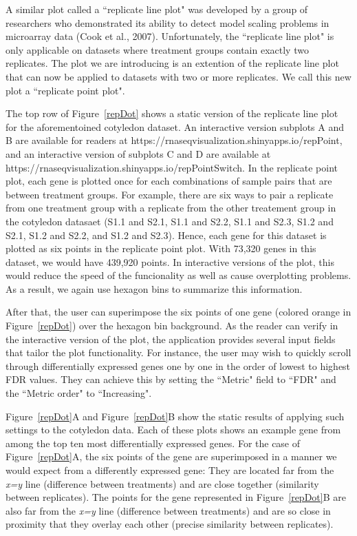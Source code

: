 \documentclass[useAMS,referee]{biom}
\begin{document}
A similar plot called a ``replicate line plot" was developed by a group of researchers who demonstrated its ability to detect model scaling problems in microarray data (Cook et al., 2007). Unfortunately, the ``replicate line plot" is only applicable on datasets where treatment groups contain exactly two replicates. The plot we are introducing is an extention of the replicate line plot that can now be applied to datasets with two or more replicates. We call this new plot a ``replicate point plot".

The top row of Figure~\ref{repDot} shows a static version of the replicate line plot for the aforementoined cotyledon dataset. An interactive version subplots A and B are available for readers at https://rnaseqvisualization.shinyapps.io/repPoint, and an interactive version of subplots C and D are available at https://rnaseqvisualization.shinyapps.io/repPointSwitch. In the replicate point plot, each gene is plotted once for each combinations of sample pairs that are between treatment groups. For example, there are six ways to pair a replicate from one treatment group with a replicate from the other treatement group in the cotyledon datasaet (S1.1 and S2.1, S1.1 and S2.2, S1.1 and S2.3, S1.2 and S2.1, S1.2 and S2.2, and S1.2 and S2.3). Hence, each gene for this dataset is plotted as six points in the replicate point plot. With 73,320 genes in this dataset, we would have 439,920 points. In interactive versions of the plot, this would reduce the speed of the funcionality as well as cause overplotting problems. As a result, we again use hexagon bins to summarize this information.

After that, the user can superimpose the six points of one gene (colored orange in Figure~\ref{repDot}) over the hexagon bin background. As the reader can verify in the interactive version of the plot, the application provides several input fields that tailor the plot functionality. For instance, the user may wish to quickly scroll through differentially expressed genes one by one in the order of lowest to highest FDR values. They can achieve this by setting the ``Metric" field to ``FDR" and the ``Metric order" to ``Increasing". 

Figure~\ref{repDot}A and Figure~\ref{repDot}B show the static results of applying such settings to the cotyledon data. Each of these plots shows an example gene from among the top ten most differentially expressed genes. For the case of Figure~\ref{repDot}A, the six points of the gene are superimposed in a manner we would expect from a differently expressed gene: They are located far from the \textit{x=y} line (difference between treatments) and are close together (similarity between replicates). The points for the gene represented in Figure~\ref{repDot}B are also far from the \textit{x=y} line (difference between treatments) and are so close in proximity that they overlay each other (precise similarity between replicates).
\end{document}
